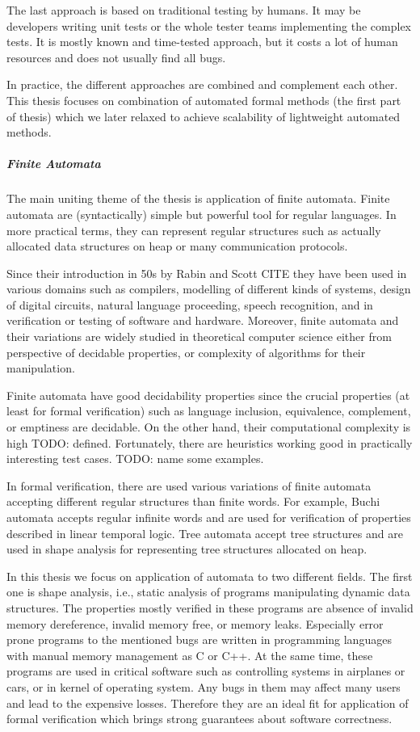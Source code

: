 The last approach is based on traditional testing by humans. It may be developers
writing unit tests or the whole tester teams implementing the complex tests.
It is mostly known and time-tested approach, but it costs a lot of human resources and
does not usually find all bugs.

In practice, the different approaches are combined and complement each other.
This thesis focuses on combination of automated formal methods (the first part of thesis)
which we later relaxed to achieve scalability of lightweight automated methods.

\subparagraph{Finite Automata}
The main uniting theme of the thesis is application of finite automata.
Finite automata are (syntactically) simple but powerful tool for regular
languages. In more practical terms, they can represent regular structures
such as actually allocated data structures on heap or many communication protocols.

Since their introduction in 50s by Rabin and Scott CITE they have been used in
various domains such as compilers, modelling of different kinds of systems,
design of digital circuits, natural language proceeding, speech recognition,
and in verification or testing of software and hardware.
Moreover, finite automata and their variations are widely studied in theoretical computer science either
from perspective of decidable properties, or complexity of algorithms for their manipulation.

Finite automata have good decidability properties since the crucial properties (at least for formal verification)
such as language inclusion, equivalence, complement, or emptiness are decidable.
On the other hand, their computational complexity is high
TODO: defined.
Fortunately, there are heuristics working good in practically interesting test cases.
TODO: name some examples.

In formal verification, there are used various variations of finite automata
accepting different regular structures than finite words.
For example, Buchi automata accepts regular infinite words and are used
for verification of properties described in linear temporal logic.
Tree automata accept tree structures and are used in shape analysis
for representing tree structures allocated on heap.

In this thesis we focus on application of automata to two different fields.
The first one is shape analysis, i.e., static analysis of programs manipulating
dynamic data structures.
The properties mostly verified in these programs are absence of invalid memory
dereference, invalid memory free, or memory leaks.
Especially error prone programs to the mentioned bugs are written in programming
languages with manual memory management as C or C++.
At the same time, these programs are used in critical software such as controlling
systems in airplanes or cars, or in kernel of operating system.
Any bugs in them may affect many users and lead to the expensive losses.
Therefore they are an ideal fit for application of formal verification which
brings strong guarantees about software correctness.


